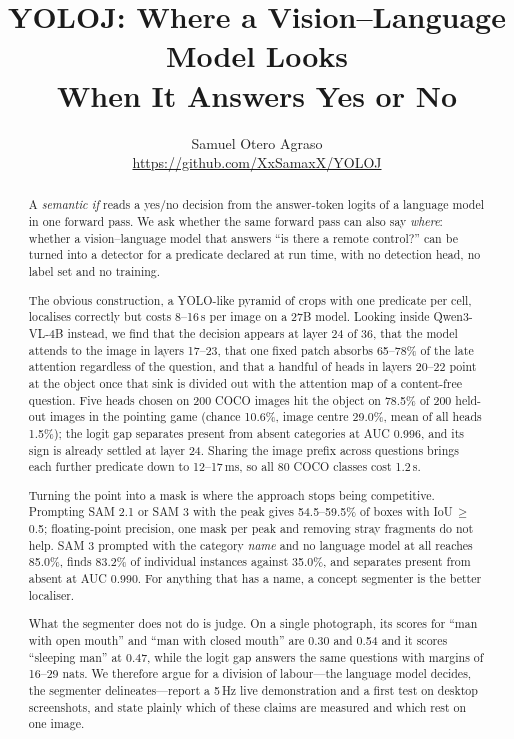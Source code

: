 \documentclass[10pt,twocolumn]{article}
\title{\vspace{-1.2cm}\bfseries YOLOJ: Where a Vision--Language Model Looks\\
When It Answers Yes or No}
\author{%
Samuel Otero Agraso\\
\small\url{https://github.com/XxSamaxX/YOLOJ}
}
\date{}
\begin{document}
\maketitle

\begin{abstract}
\noindent
A \emph{semantic if} reads a yes/no decision from the answer-token logits of a
language model in one forward pass. We ask whether the same forward pass can
also say \emph{where}: whether a vision--language model that answers ``is there
a remote control?'' can be turned into a detector for a predicate declared at
run time, with no detection head, no label set and no training.

The obvious construction, a YOLO-like pyramid of crops with one predicate per
cell, localises correctly but costs 8--16\,s per image on a 27B model. Looking
inside Qwen3-VL-4B instead, we find that the decision appears at layer 24 of
36, that the model attends to the image in layers 17--23, that one fixed patch
absorbs 65--78\% of the late attention regardless of the question, and that a
handful of heads in layers 20--22 point at the object once that sink is divided
out with the attention map of a content-free question. Five heads chosen on 200
COCO images hit the object on 78.5\% of 200 held-out images in the pointing
game (chance 10.6\%, image centre 29.0\%, mean of all heads 1.5\%); the logit
gap separates present from absent categories at AUC 0.996, and its sign is
already settled at layer 24. Sharing the image prefix across questions brings
each further predicate down to 12--17\,ms, so all 80 COCO classes cost 1.2\,s.

Turning the point into a mask is where the approach stops being competitive.
Prompting SAM 2.1 or SAM 3 with the peak gives 54.5--59.5\% of boxes with
IoU\,$\geq$\,0.5; floating-point precision, one mask per peak and removing
stray fragments do not help. SAM 3 prompted with the category \emph{name} and
no language model at all reaches 85.0\%, finds 83.2\% of individual instances
against 35.0\%, and separates present from absent at AUC 0.990. For anything
that has a name, a concept segmenter is the better localiser.

What the segmenter does not do is judge. On a single photograph, its scores
for ``man with open mouth'' and ``man with closed mouth'' are 0.30 and 0.54 and
it scores ``sleeping man'' at 0.47, while the logit gap answers the same
questions with margins of 16--29 nats. We therefore argue for a division of
labour---the language model decides, the segmenter delineates---report a
5\,Hz live demonstration and a first test on desktop screenshots, and state
plainly which of these claims are measured and which rest on one image.
\end{abstract}
\end{document}
